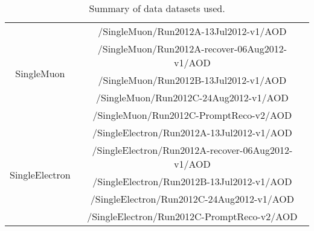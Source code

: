 \begin{table}[!ht]
\begin{center}
\begin{tabular}{|c|c|}
\hline
\multirow{5}{*}{SingleMuon}			   	&  /SingleMuon/Run2012A-13Jul2012-v1/AOD   			\\
								       	&  /SingleMuon/Run2012A-recover-06Aug2012-v1/AOD   	\\
								       	&  /SingleMuon/Run2012B-13Jul2012-v1/AOD   			\\
								       	&  /SingleMuon/Run2012C-24Aug2012-v1/AOD   			\\
					                	&  /SingleMuon/Run2012C-PromptReco-v2/AOD   		\\
\hline
\multirow{5}{*}{SingleElectron}		   	&  /SingleElectron/Run2012A-13Jul2012-v1/AOD   			\\
								       	&  /SingleElectron/Run2012A-recover-06Aug2012-v1/AOD   	\\
								       	&  /SingleElectron/Run2012B-13Jul2012-v1/AOD   			\\
								       	&  /SingleElectron/Run2012C-24Aug2012-v1/AOD   			\\
					                	&  /SingleElectron/Run2012C-PromptReco-v2/AOD   		\\
\hline
\end{tabular}
\caption{Summary of data datasets used.\label{tab:DatasetsData}}
\end{center}
\end{table}

